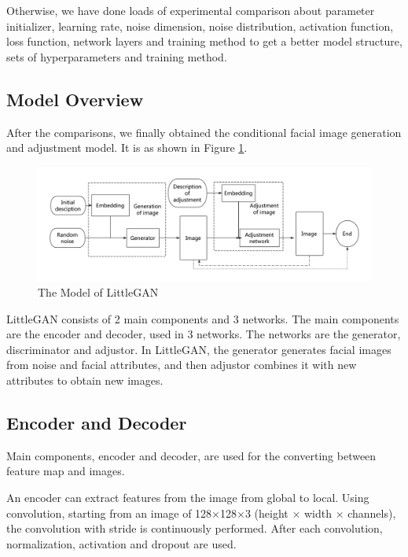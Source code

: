 Otherwise, we have done loads of experimental comparison about parameter initializer, learning rate, noise dimension, noise distribution, activation function, loss function, network layers and training method to get a better model structure, sets of hyperparameters and training method.

\subsection{Model Overview}

After the comparisons, we finally obtained the conditional facial image generation and adjustment model.
It is as shown in Figure \ref{smliegan}.

\begin{figure}
    \begin{center}
    \includegraphics[width=\textwidth]{figures/model.pdf}
    \caption{The Model of LittleGAN}
    \label{smliegan}
    \end{center}
\end{figure}

LittleGAN consists of 2 main components and 3 networks.
The main components are the encoder and decoder, used in 3 networks.
The networks are the generator, discriminator and adjustor.
In LittleGAN, the generator generates facial images from noise and facial attributes,
    and then adjustor combines it with new attributes to obtain new images.


\subsection{Encoder and Decoder}


Main components, encoder and decoder, are used for the converting between feature map and images.

An encoder can extract features from the image from global to local.
Using convolution, starting from an image of 128×128×3 (height × width × channels),
    the convolution with stride is continuously performed.
After each convolution, normalization, activation and dropout are used.

